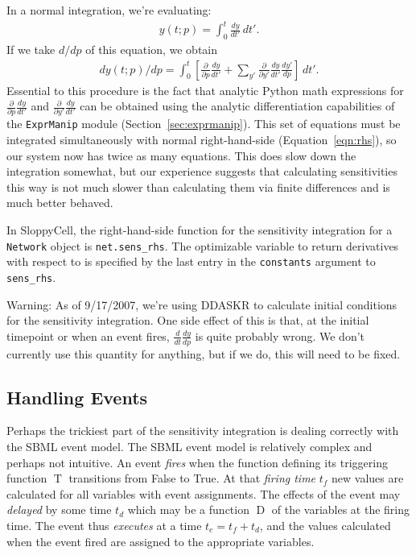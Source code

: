 \documentclass[12pt]{article}
\makeatletter
\newcommand{\py}[1]{\lstinline[language=Python, showstringspaces=False]@#1@}
\newcommand{\trigger}{\ensuremath{\operatorname{T}}\xspace}
\newcommand{\delay}{\ensuremath{\operatorname{D}}\xspace}
\makeatother
\begin{document}
In a normal integration, we're evaluating:
\begin{align}\label{eqn:rhs}
y(t; p) = \int_0^t \frac{dy}{dt'} \, dt'.
\end{align}
If we take $d/dp$ of this equation, we obtain
\begin{align}
dy(t; p)/dp = \int_0^t \left[\frac{\partial}{\partial p} \frac{dy}{dt'} 
+ \sum_{y'} \frac{\partial}{\partial y'} \frac{dy}{dt'} \frac{dy'}{dp}\right] \,dt'.
\end{align}
Essential to this procedure is the fact that analytic Python math expressions for $\frac{\partial}{\partial p} \frac{dy}{dt'}$ and $\frac{\partial}{\partial y'} \frac{dy}{dt'}$ can be obtained using the analytic differentiation capabilities of the \py{ExprManip} module (Section~\ref{sec:exprmanip}).
This set of equations must be integrated simultaneously with normal right-hand-side (Equation~\ref{eqn:rhs}), so our system now has twice as many equations.
This does slow down the integration somewhat, but our experience suggests that calculating sensitivities this way is not much slower than calculating them via finite differences and is much better behaved.

In SloppyCell, the right-hand-side function for the sensitivity integration for a \py{Network} object is \py{net.sens_rhs}.
The optimizable variable to return derivatives with respect to is specified by the last entry in the \py{constants} argument to \py{sens_rhs}.

Warning: As of 9/17/2007, we're using DDASKR to calculate initial conditions for the sensitivity integration. One side effect of this is that, at the initial timepoint or when an event fires, $\frac{d}{dt} \frac{d y}{dp}$ is quite probably wrong. We don't currently use this quantity for anything, but if we do, this will need to be fixed.

\subsection{Handling Events}
Perhaps the trickiest part of the sensitivity integration is dealing correctly with the SBML event model.
The SBML event model is relatively complex and perhaps not intuitive.
An event \emph{fires} when the function defining its triggering function \trigger transitions from False to True. 
At that \emph{firing time} $t_f$ new values are calculated for all variables with event assignments. 
The effects of the event may \emph{delayed} by some time $t_d$ which may be a function \delay of the variables at the firing time. 
The event thus \emph{executes} at a time $t_e = t_f + t_d$, and the values calculated when the event fired are assigned to the appropriate variables.
\end{document}
